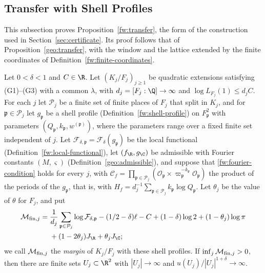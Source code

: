 \subsection{Transfer with Shell Profiles}

This subsection proves Proposition~\ref{fw:transfer}, the form of the
construction used in Section~\ref{sec:certificate}. Its proof follows that of
Proposition~\ref{geo:transfer}, with the window and the lattice extended by
the finite coordinates of Definition~\ref{fw:finite-coordinates}.

\begin{proposition}\label{fw:transfer}
Let $0<\delta<1$ and $C\in\R$. Let $(K_j/F_j)_{j\ge1}$ be quadratic
extensions satisfying (G1)--(G3) with a common $\lambda$, with
$d_j=[F_j:\Q]\to\infty$ and $\log L_{F_j}(1)\le d_jC$. For each $j$ let
$\mathcal P_j$ be a finite set of finite places of $F_j$ that split in
$K_j$, and for $\mathfrak p\in\mathcal P_j$ let $g_{\mathfrak p}$ be a
shell profile (Definition~\ref{fw:shell-profile}) on $F_{\mathfrak p}^2$ with
parameters $(Q_{\mathfrak p},k_{\mathfrak p},w^{(\mathfrak p)})$, where the
parameters range over a fixed finite set independent of $j$. Let
$\mathcal F_{\delta,\mathfrak p}=\mathcal F_\delta(g_{\mathfrak p})$ be the
local functional (Definition~\ref{fw:local-functional}), let $(f_\R,g_\C)$ be
admissible with Fourier constants $(M,\varsigma)$
(Definition~\ref{geo:admissible}), and suppose that
\eqref{fw:fourier-condition} holds for every $j$, with $\mathcal
C_f=\prod_{\mathfrak p\in\mathcal P_j}(\mathcal O_{\mathfrak
p}\times\varpi_{\mathfrak p}^{-k_{\mathfrak p}}\mathcal O_{\mathfrak p})$
the product of the periods of the $g_{\mathfrak p}$, that is, with
$H_f=d_j^{-1}\sum_{\mathfrak p\in\mathcal P_j}k_{\mathfrak p}\log
Q_{\mathfrak p}$. Let $\theta_j$ be the value of $\theta$ for $F_j$, and
put
\begin{equation}\label{fw:margin}
 \begin{split}
 \mathcal M_{{\rm fin},j}={}&
 \frac1{d_j}\sum_{\mathfrak p\in\mathcal P_j}\log\mathcal F_{\delta,\mathfrak p}
 -(1/2-\delta)\ell-C+(1-\delta)\log2+(1-\theta_j)\log\pi\\
 &+(1-2\theta_j)J_\R+\theta_jJ_\C ;
 \end{split}
\end{equation}
we call $\mathcal M_{{\rm fin},j}$ the \emph{margin} of $K_j/F_j$ with
these shell profiles. If $\inf_j\mathcal M_{{\rm fin},j}>0$, then there
are finite sets $U_j\subset\R^2$ with $|U_j|\to\infty$ and
$u(U_j)/|U_j|^{1+\delta}\to\infty$.
\end{proposition}

